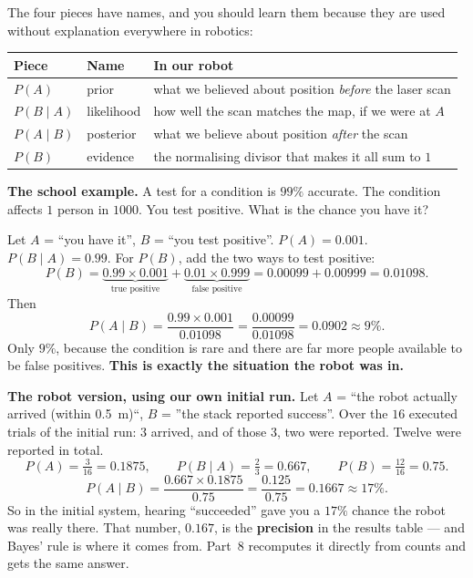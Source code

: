 \documentclass[11pt,a4paper]{report}
\begin{document}
The four pieces have names, and you should learn them because they are used
without explanation everywhere in robotics:
\begin{center}
\begin{tabular}{@{}lll@{}}
\toprule
\textbf{Piece} & \textbf{Name} & \textbf{In our robot} \\
\midrule
$P(A)$ & prior & what we believed about position \emph{before} the laser scan \\
$P(B \mid A)$ & likelihood & how well the scan matches the map, if we were at $A$ \\
$P(A \mid B)$ & posterior & what we believe about position \emph{after} the scan \\
$P(B)$ & evidence & the normalising divisor that makes it all sum to $1$ \\
\bottomrule
\end{tabular}
\end{center}

\begin{handbox}
\textbf{The school example.} A test for a condition is $99\%$ accurate. The
condition affects $1$ person in $1000$. You test positive. What is the chance
you have it?

Let $A$ = ``you have it'', $B$ = ``you test positive''.
$P(A) = 0.001$. $P(B \mid A) = 0.99$. For $P(B)$, add the two ways to test
positive:
\[
P(B) = \underbrace{0.99 \times 0.001}_{\text{true positive}}
     + \underbrace{0.01 \times 0.999}_{\text{false positive}}
     = 0.00099 + 0.00999 = 0.01098 .
\]
Then
\[
P(A \mid B) = \frac{0.99 \times 0.001}{0.01098} = \frac{0.00099}{0.01098}
= 0.0902 \approx 9\% .
\]
Only $9\%$, because the condition is rare and there are far more people
available to be false positives. \textbf{This is exactly the situation the
robot was in.}

\smallskip
\textbf{The robot version, using our own initial run.} Let $A$ = ``the robot
actually arrived (within \SI{0.5}{\metre})``, $B$ = ''the stack reported
success''. Over the $16$ executed trials of the initial run: $3$ arrived, and of
those $3$, two were reported. Twelve were reported in total.
\[
P(A) = \tfrac{3}{16} = 0.1875, \qquad
P(B \mid A) = \tfrac{2}{3} = 0.667, \qquad
P(B) = \tfrac{12}{16} = 0.75 .
\]
\[
P(A \mid B) = \frac{0.667 \times 0.1875}{0.75}
= \frac{0.125}{0.75} = 0.1667 \approx 17\% .
\]
So in the initial system, hearing ``succeeded'' gave you a $17\%$ chance the
robot was really there. That number, $0.167$, is the \textbf{precision} in the
results table --- and Bayes' rule is where it comes from. Part~8 recomputes it
directly from counts and gets the same answer.
\end{handbox}
\end{document}
